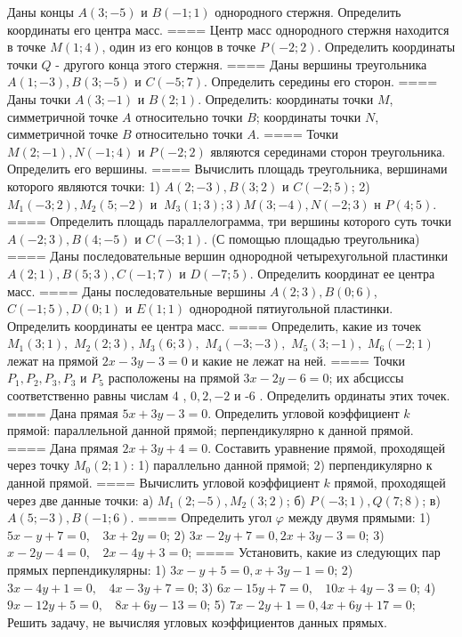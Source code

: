 Даны концы \(A(3; - 5)\) и \(B( - 1;1)\) однородного стержня. Определить координаты его центра масс.
====
Центр масс однородного стержня находится в точке \(M(1;4)\), один из его концов в точке \(P( - 2;2)\). Определить координаты точки \(Q\) - другого конца этого стержня.
====
Даны вершины треугольника \(A(1; - 3),B(3; - 5)\) и \(C( - 5;7)\). Определить середины его сторон.
====
Даны точки \(A(3; - 1)\) и \(B(2;1)\). Определить: координаты точки \(M\), симметричной точке \(A\) относительно точки \(B\); координаты точки \(N\), симметричной точке \(B\) относительно точки \(A\).
====
Точки \(M(2; - 1),N( - 1;4)\) и \(P( - 2;2)\) являются серединами сторон треугольника. Определить его вершины.
====
Вычислить площадь треугольника, вершинами которого являются точки: 1) \(A(2; - 3),B(3;2)\) и \(C( - 2;5)\); 2) \(M_{1}( - 3;2),M_{2}(5; - 2)\) и \(\left. \ M_{3}(1;3);3 \right)M(3; - 4),N( - 2;3)\) н \(P(4;5)\).
====
Определить площадь параллелограмма, три вершины которого суть точки \(A( - 2;3),B(4; - 5)\) и \(C( - 3;1)\). (С помощью площадью треугольника)
====
Даны последовательные вершин однородной четырехугольной пластинки \(A(2;1),B(5;3),C( - 1;7)\) и \(D( - 7;5)\). Определить координат ее центра масс.
====
Даны последовательные вершины \(A(2;3),B(0;6)\), \(C( - 1;5),D(0;1)\) и \(E(1;1)\) однородной пятиугольной пластинки. Определить координаты ее центра масс.
====
Определить, какие из точек \(M_{1}(3;1),\) \(M_{2}(2;3)\), \(M_{3}(6;3),\) \(M_{4}( - 3; - 3),\) \(M_{5}(3; - 1),\) \(M_{6}( - 2;1)\) лежат на прямой \(2x - 3y - 3 = 0\) и какие не лежат на ней.
====
Точки \(P_{1},P_{2},P_{3},P_{3}\) и \(P_{5}\) расположены на прямой \(3x - 2y - 6 = 0\); их абсциссы соответственно равны числам 4 , \(0,2, - 2\) и -6 . Определить ординаты этих точек.
====
Дана прямая \(5x + 3y - 3 = 0\). Определить угловой коэффициент \(k\) прямой: параллельной данной прямой; перпендикулярно к данной прямой.
====
Дана прямая \(2x + 3y + 4 = 0\). Составить уравнение прямой, проходящей через точку \(M_{0}(2;1)\): 1) параллельно данной прямой; 2) перпендикулярно к данной прямой.
====
Вычислить угловой коэффициент \(k\) прямой, проходящей через две данные точки: а) \(M_{1}(2; - 5),M_{2}(3;2)\); б) \(P( - 3;1),Q(7;8)\); в) \(A(5; - 3),B( - 1;6)\).
====
Определить угол \(\varphi\) между двумя прямыми: 1) \(5x - y + 7 = 0,\ \ \ \ 3x + 2y = 0\); 2) \(3x - 2y + 7 = 0,2x + 3y - 3 = 0\); 3) \(x - 2y - 4 = 0,\ \ \ \ 2x - 4y + 3 = 0\);
====
Установить, какие из следующих пар прямых перпендикулярны: 1) \(3x - y + 5 = 0,x + 3y - 1 = 0\); 2) \(3x - 4y + 1 = 0,\ \ \ \ 4x - 3y + 7 = 0\); 3) \(6x - 15y + 7 = 0,\ \ \ \ 10x + 4y - 3 = 0\); 4) \(9x - 12y + 5 = 0,\ \ \ \ 8x + 6y - 13 = 0\); 5) \(7x - 2y + 1 = 0,4x + 6y + 17 = 0\); Решить задачу, не вычисляя угловых коэффициентов данных прямых.
